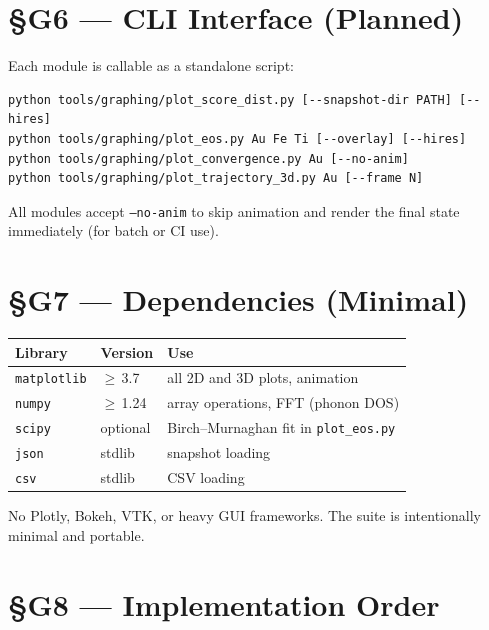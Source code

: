 \documentclass[11pt,a4paper]{article}
\begin{document}
\section{\S{}G6 --- CLI Interface (Planned)}

Each module is callable as a standalone script:

\begin{verbatim}
python tools/graphing/plot_score_dist.py [--snapshot-dir PATH] [--hires]
python tools/graphing/plot_eos.py Au Fe Ti [--overlay] [--hires]
python tools/graphing/plot_convergence.py Au [--no-anim]
python tools/graphing/plot_trajectory_3d.py Au [--frame N]
\end{verbatim}

All modules accept \texttt{--no-anim} to skip animation and render the final
state immediately (for batch or CI use).

\section{\S{}G7 --- Dependencies (Minimal)}

\begin{center}
\begin{tabular}{lll}
\toprule
Library & Version & Use \\
\midrule
\texttt{matplotlib} & $\geq$\,3.7  & all 2D and 3D plots, animation \\
\texttt{numpy}      & $\geq$\,1.24 & array operations, FFT (phonon DOS) \\
\texttt{scipy}      & optional     & Birch--Murnaghan fit in \texttt{plot\_eos.py} \\
\texttt{json}       & stdlib       & snapshot loading \\
\texttt{csv}        & stdlib       & CSV loading \\
\bottomrule
\end{tabular}
\end{center}

No Plotly, Bokeh, VTK, or heavy GUI frameworks.
The suite is intentionally minimal and portable.

\section{\S{}G8 --- Implementation Order}
\end{document}
